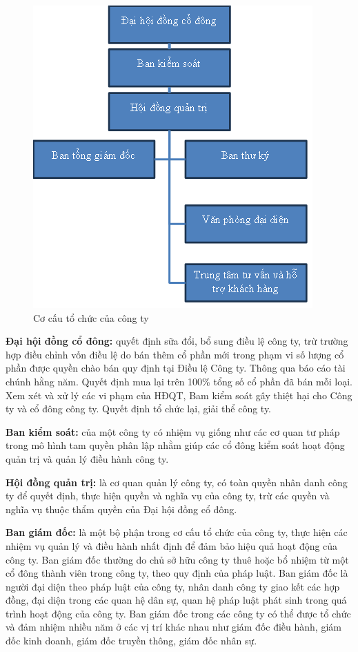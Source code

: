 \documentclass[12pt,a4paper]{report}
\begin{document}
		\begin{figure}[h]
			\centering
			\includegraphics[width=0.75\linewidth]{"Pics/Mo_hinh_cong_ty"}
			\caption{Cơ cấu tổ chức của công ty}
			\label{fig:logo-hvMo_hinh_cong_ty}
		\end{figure}
	
		\hspace{1.0cm} {\textbf{Đại hội đồng cổ đông: } quyết định sữa đổi, bổ sung điều lệ công ty, trừ trường hợp điều chỉnh vốn điều lệ do bán thêm cổ phần mới trong phạm vi số lượng cổ phần được quyền chào bán quy định tại Điều lệ Công ty. Thông qua báo cáo tài chúnh hằng năm. Quyết định mua lại trên 100\% tổng số cổ phần đã bán mỗi loại. Xem xét và xử lý các vi phạm của HĐQT, Bam kiểm soát gây thiệt hại cho Công ty và cổ đông công ty. Quyết định tổ chức lại, giải thể công ty.}
		
		\hspace{0.3cm} {\textbf{Ban kiểm soát: } của một công ty có nhiệm vụ giống như các cơ quan tư pháp trong mô hình tam quyền phân lập nhằm giúp các cổ đông kiểm soát hoạt động quản trị và quản lý điều hành công ty.}
		
		\hspace{0.3cm} {\textbf{Hội đồng quản trị: } là cơ quan quản lý công ty, có toàn quyền nhân danh công ty để quyết định, thực hiện quyền và nghĩa vụ của công ty, trừ các quyền và nghĩa vụ thuộc thẩm quyền của Đại hội đồng cổ đông.}
		
		\hspace{0.3cm} {\textbf{Ban giám đốc: } là một bộ phận trong cơ cấu tổ chức của công ty, thực hiện các nhiệm vụ quản lý và điều hành nhất định để đảm bảo hiệu quả hoạt động của công ty. Ban giám đốc thường do chủ sở hữu công ty thuê hoặc bổ nhiệm từ một cổ đông thành viên trong công ty, theo quy định của pháp luật. Ban giám đốc là người đại diện theo pháp luật của công ty, nhân danh công ty giao kết các hợp đồng, đại diện trong các quan hệ dân sự, quan hệ pháp luật phát sinh trong quá trình hoạt động của công ty. Ban giám đốc trong các công ty có thể được tổ chức và đảm nhiệm nhiều năm ở các vị trí khác nhau như giám đốc điều hành, giám đốc kinh doanh, giám đốc truyền thông, giám đốc nhân sự.}
		
\end{document}
